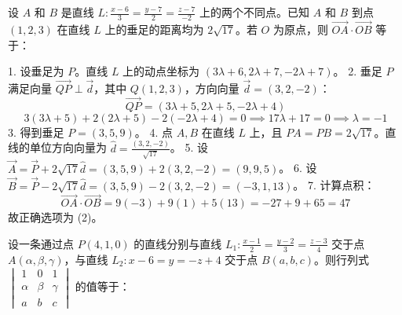 \begin{questions}
\question
设 $A$ 和 $B$ 是直线 $L : \frac{x-6}{3} = \frac{y-7}{2} = \frac{z-7}{-2}$ 上的两个不同点。已知 $A$ 和 $B$ 到点 $(1, 2, 3)$ 在直线 $L$ 上的垂足的距离均为 $2\sqrt{17}$。若 $O$ 为原点，则 $\vec{OA} \cdot \vec{OB}$ 等于：

\begin{solution}
1. 设垂足为 $P$。直线 $L$ 上的动点坐标为 $(3\lambda+6, 2\lambda+7, -2\lambda+7)$。
2. 垂足 $P$ 满足向量 $\vec{QP} \perp \vec{d}$，其中 $Q(1, 2, 3)$，方向向量 $\vec{d} = (3, 2, -2)$：
\[
\vec{QP} = (3\lambda+5, 2\lambda+5, -2\lambda+4)
\]
\[
3(3\lambda+5) + 2(2\lambda+5) - 2(-2\lambda+4) = 0 \implies 17\lambda + 17 = 0 \implies \lambda = -1
\]
3. 得到垂足 $P = (3, 5, 9)$。
4. 点 $A, B$ 在直线 $L$ 上，且 $PA = PB = 2\sqrt{17}$。直线的单位方向向量为 $\hat{d} = \frac{(3, 2, -2)}{\sqrt{17}}$。
5. 设 $\vec{A} = \vec{P} + 2\sqrt{17}\hat{d} = (3, 5, 9) + 2(3, 2, -2) = (9, 9, 5)$。
6. 设 $\vec{B} = \vec{P} - 2\sqrt{17}\hat{d} = (3, 5, 9) - 2(3, 2, -2) = (-3, 1, 13)$。
7. 计算点积：
\[
\vec{OA} \cdot \vec{OB} = 9(-3) + 9(1) + 5(13) = -27 + 9 + 65 = 47
\]
故正确选项为 (2)。
\end{solution}

\question
设一条通过点 $P(4, 1, 0)$ 的直线分别与直线 $L_1 : \frac{x-1}{2} = \frac{y-2}{3} = \frac{z-3}{4}$ 交于点 $A(\alpha, \beta, \gamma)$，与直线 $L_2 : x-6 = y = -z+4$ 交于点 $B(a, b, c)$。则行列式 $\begin{vmatrix} 1 & 0 & 1 \\ \alpha & \beta & \gamma \\ a & b & c \end{vmatrix}$ 的值等于：


\end{questions}
